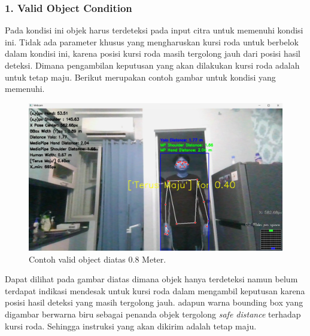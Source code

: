\subsubsection*{1. Valid Object Condition}
Pada kondisi ini objek harus terdeteksi pada input citra untuk memenuhi kondisi ini. Tidak ada parameter khusus yang mengharuskan kursi roda untuk berbelok dalam kondisi ini, karena posisi kursi roda masih tergolong jauh dari posisi hasil deteksi. Dimana pengambilan keputusan yang akan dilakukan kursi roda adalah untuk tetap maju. Berikut merupakan contoh gambar untuk kondisi yang memenuhi. 

\begin{figure}[H]
  \centering
  \includegraphics[scale=0.3]{gambar/posisibiru.png}
  \caption{Contoh valid object diatas 0.8 Meter.}
  \label{fig:Valid object diatas 0.8 Meter.}
\end{figure}

Dapat dilihat pada gambar diatas dimana objek hanya terdeteksi namun belum terdapat indikasi mendesak untuk kursi roda dalam mengambil keputusan karena posisi hasil deteksi yang masih tergolong jauh. adapun warna bounding box yang digambar berwarna biru sebagai penanda objek tergolong \emph{safe distance} terhadap kursi roda. Sehingga instruksi yang akan dikirim adalah tetap maju. 

